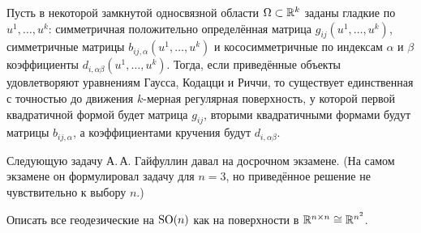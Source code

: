 \begin{theorem}[Бонне]
	Пусть в некоторой замкнутой односвязной области $\Omega \subset \mathbb{R}^k$ заданы гладкие по $u^1, \ldots, u^k$: симметричная положительно определённая матрица $g_{ij}(u^1, \ldots, u^k)$, симметричные матрицы $b_{ij, \alpha}(u^1, \ldots, u^k)$ и кососимметричные по индексам $\alpha$ и $\beta$ коэффициенты $d_{i, \alpha\beta}(u^1, \ldots, u^k)$. Тогда, если приведённые объекты удовлетворяют уравнениям Гаусса, Кодацци и Риччи, то существует единственная с точностью до движения $k$-мерная регулярная поверхность, у которой первой квадратичной формой будет матрица $g_{ij}$, вторыми квадратичными формами будут матрицы $b_{ij, \alpha}$, а коэффициентами кручения будут $d_{i, \alpha\beta}$.
\end{theorem}

Следующую задачу А.\,А. Гайфуллин давал на досрочном экзамене. (На самом экзамене он формулировал задачу для $n = 3$, но приведённое решение не чувствительно к выбору $n$.)

\begin{problem}
	Описать все геодезические на $\mathrm{SO}(n)$ как на поверхности в $\mathbb{R}^{n \times n} \cong \mathbb{R}^{n^2}$.
\end{problem}

